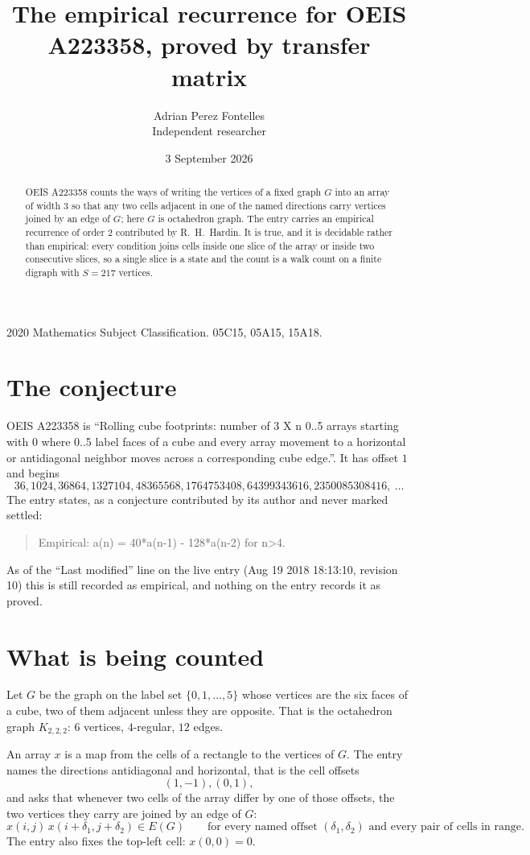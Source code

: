 \documentclass[11pt,a4paper]{article}
\title{The empirical recurrence for OEIS A223358, proved by transfer matrix}
\author{Adrian Perez Fontelles\\ \small Independent researcher}
\date{3 September 2026}
\theoremstyle{plain}
\theoremstyle{definition}
\begin{document}
\maketitle

\begin{abstract}
OEIS A223358 counts the ways of writing the vertices of a fixed graph $G$ into an array of width
$3$ so that any two cells adjacent in one of the named directions carry vertices joined by an
edge of $G$; here $G$ is octahedron graph. The entry carries an empirical recurrence of order $2$
contributed by R.~H.~Hardin. It is true, and it is decidable rather than empirical: every
condition joins cells inside one slice of the array or inside two consecutive slices, so a
single slice is a state and the count is a walk count on a finite digraph with $S=217$ vertices.
\end{abstract}

\noindent\small 2020 Mathematics Subject Classification. 05C15, 05A15, 15A18.\normalsize

\section{The conjecture}

OEIS A223358 is ``Rolling cube footprints: number of 3 X n 0..5 arrays starting with 0 where 0..5 label faces of a cube and every array movement to a horizontal or antidiagonal neighbor moves across a corresponding cube edge.''. It has offset $1$ and begins
\[
36, 1024, 36864, 1327104, 48365568, 1764753408, 64399343616, 2350085308416,\ \dots
\]
The entry states, as a conjecture contributed by its author and never marked settled:
\begin{quote}
Empirical: a(n) = 40*a(n-1) - 128*a(n-2) for n>4.
\end{quote}
As of the ``Last modified'' line on the live entry (Aug 19 2018 18:13:10, revision 10) this is still
recorded as empirical, and nothing on the entry records it as proved.

\section{What is being counted}

Let $G$ be the graph on the label set $\{0,1,\dots,5\}$ whose vertices are the six faces of a cube, two of them adjacent unless they are opposite. That is the octahedron graph $K_{2,2,2}$: $6$ vertices, $4$-regular, $12$ edges.

An array $x$ is a map from the cells of a rectangle to the vertices of $G$. The entry names the
directions antidiagonal and horizontal, that is the cell offsets
\[
(1,-1), (0,1),
\]
and asks that whenever two cells of the array differ by one of those offsets, the two vertices
they carry are joined by an edge of $G$:
\[
x(i,j)\,x(i+\delta_1,j+\delta_2)\in E(G)\qquad
\text{for every named offset } (\delta_1,\delta_2)\text{ and every pair of cells in range.}
\]
The entry also fixes the top-left cell: $x(0,0)=0$.
\end{document}
